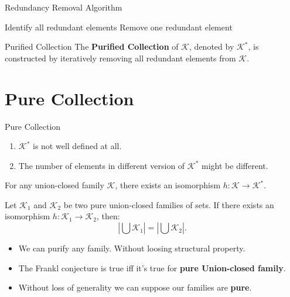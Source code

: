 \documentclass{beamer}
\begin{document}
\begin{frame}{Redundancy Removal Algorithm}
	\begin{algorithm}[H]
		\caption[o]{Redundancy Removal}
		\begin{algorithmic}[1]
			\State Identify all redundant elements
			\State Remove one redundant element
			\EndWhile
		\end{algorithmic}
	\end{algorithm}
	\vfill
	\pause

	\begin{block}{Purified Collection}
		The \textbf{Purified Collection} of \( \mathcal{K} \), denoted by \( \mathcal{K}^* \), is constructed by iteratively removing all redundant elements from \( \mathcal{K} \).
	\end{block}

\end{frame}

\section{Pure Collection}
\begin{frame}{Pure Collection}
	\begin{enumerate}
		\item  \(\mathcal{K}^*\) is not well defined at all.
		\item The number of elements in different version of \(\mathcal{K}^*\) might be different.
	\end{enumerate}
	\vfill
	\pause
	\begin{corollary}[1.3]
		For any union-closed family \( \mathcal{K} \), there exists an isomorphism \( h: \mathcal{K} \to \mathcal{K}^* \).
	\end{corollary}

\end{frame}

\begin{frame}
	\begin{corollary}[2.1]
		Let \( \mathcal{K}_1 \) and \( \mathcal{K}_2 \) be two pure union-closed families of sets. If there exists an isomorphism \( h: \mathcal{K}_1 \to \mathcal{K}_2 \), then:
		\[
			\left|\bigcup \mathcal{K}_1\right| = \left|\bigcup \mathcal{K}_2\right|.
		\]
	\end{corollary}
\end{frame}

\begin{frame}
	\begin{itemize}
		\item We can purify any family. Without loosing structural property.
		      \pause
		\item The Frankl conjecture is true iff it's true for \textbf{pure Union-closed family}.
		      \pause
		\item Without loss of generality we can suppose our families are \textbf{pure}.

	\end{itemize}
\end{frame}
\end{document}
